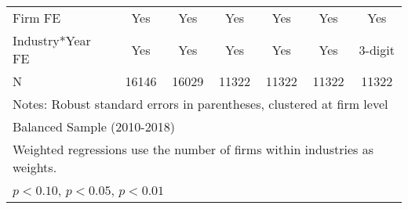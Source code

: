 \begin{table}[htbp]
\begin{tabular}{l*{6}{c}}
\midrule
Firm FE             &         Yes         &         Yes         &         Yes         &         Yes         &         Yes         &         Yes         \\
Industry*Year FE    &         Yes         &         Yes         &         Yes         &         Yes         &         Yes         &     3-digit         \\
N                   &       16146         &       16029         &       11322         &       11322         &       11322         &       11322         \\
\bottomrule
\multicolumn{7}{l}{\footnotesize Notes: Robust standard errors in parentheses, clustered at firm level}\\
\multicolumn{7}{l}{\footnotesize Balanced Sample (2010-2018)}\\
\multicolumn{7}{l}{\footnotesize Weighted regressions use the number of firms within industries as weights.}\\
\multicolumn{7}{l}{\footnotesize \sym{*} \(p<0.10\), \sym{**} \(p<0.05\), \sym{***} \(p<0.01\)}\\
\end{tabular}
\end{table}
